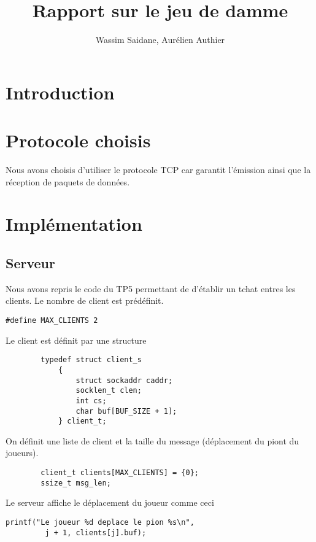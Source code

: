 \documentclass{article}
\title{Rapport sur le jeu de damme}
\author{Wassim Saidane, Aurélien Authier}
\date{}
\begin{document}
    \lstset{language=C}
    \maketitle
    \tableofcontents
    \newpage
    \section{Introduction}

    \section{Protocole choisis}
        Nous avons choisis d'utiliser le protocole TCP car garantit l’émission ainsi que la réception de paquets de données.
    \section{Implémentation}
    \subsection{Serveur}
    Nous avons repris le code du TP5 permettant de d'établir un tchat entres les clients.
    Le nombre de client est prédéfinit. 
    \begin{lstlisting}[frame=single]  
        #define MAX_CLIENTS 2
    \end{lstlisting}
    Le client est définit par une structure
    \begin{lstlisting}
        typedef struct client_s
            {
                struct sockaddr caddr;
                socklen_t clen;
                int cs;
                char buf[BUF_SIZE + 1];
            } client_t;
    \end{lstlisting}
    On définit une liste de client et la taille du message (déplacement du piont du joueurs).
    \begin{lstlisting}
        client_t clients[MAX_CLIENTS] = {0};
        ssize_t msg_len;
    \end{lstlisting}
    Le serveur affiche le déplacement du joueur comme ceci
    \begin{lstlisting}[frame=single]
        printf("Le joueur %d deplace le pion %s\n",
         j + 1, clients[j].buf);
    \end{lstlisting}

    
\end{document}
